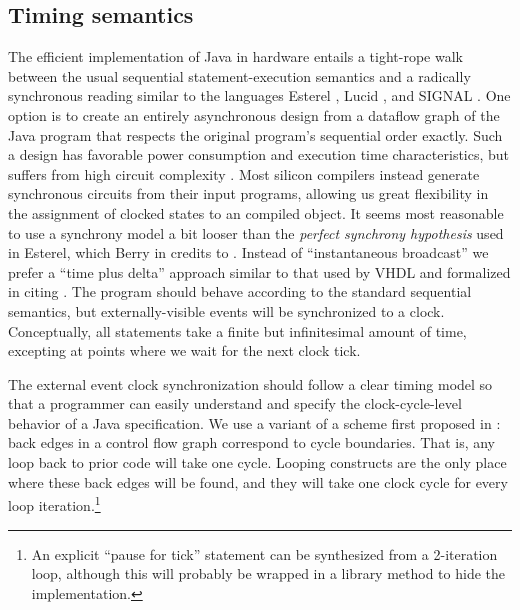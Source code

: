 \documentclass[11pt,notitlepage,twocolumn]{article}
\begin{document}
\subsection{Timing semantics}
The efficient implementation of Java in hardware entails a tight-rope walk
between the usual sequential statement-execution semantics
and a radically synchronous reading similar to the languages Esterel
\cite{berry:esterel_primer}, Lucid \cite{missing_reference}, and
SIGNAL \cite{amagbegnon95:signal}.  One option is to create an
entirely asynchronous design \cite{emerson97:async_design}
from a dataflow graph of the Java program
that respects the original program's sequential order exactly.  Such a
design has favorable power consumption and execution time
characteristics, but suffers from high circuit complexity
\cite{cheng97:diclasp, nanda97:universal}.
Most silicon compilers instead generate synchronous circuits from
their input programs, allowing us great flexibility in the assignment
of clocked states to an compiled object.  It seems most reasonable to
use a synchrony model a bit looser than the \textit{perfect synchrony
hypothesis} used in Esterel, which Berry in
\cite{berry92:hardware_esterel} credits to \cite{benveniste91:synchrony}.
Instead of ``instantaneous broadcast'' we prefer a ``time plus delta''
approach similar to that used by VHDL 
\cite{one_of_the_books_i_used_for_the_silicon_c_paper} and formalized
in \cite{gagne97:nonstandard} citing \cite{gagne96:nonstandard}.  The
program should behave according to the standard sequential semantics,
but externally-visible events will be synchronized to a clock.
Conceptually, all statements take a finite but infinitesimal amount of
time, excepting at points where we wait for the next clock tick.

The external event clock synchronization should follow a clear timing model
so that a programmer can easily understand and specify
the clock-cycle-level behavior of a Java specification.  We use a
variant of a scheme first proposed in
\cite{galloway95:transmogrifier}:  back edges in a control flow graph
correspond to cycle boundaries.  That is, any loop back to prior code
will take one cycle.  Looping constructs are the only place where
these back edges will be found, and they will take one clock cycle for
every loop iteration.\footnote{An explicit ``pause for tick'' statement
can be synthesized from a 2-iteration loop, although this will
probably be wrapped in a library method to hide the implementation.}
\end{document}
